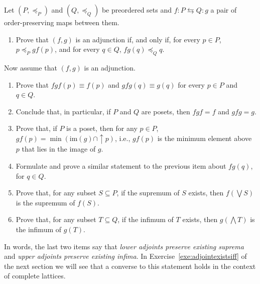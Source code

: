 \begin{exercise}\label{exe:adjunctions}
  Let $(P,\preceq_P)$ and $(Q,\preceq_Q)$ be preordered sets and $f \colon P \leftrightarrows Q \colon g$ a pair of order-preserving maps between them.
  \begin{enumerate}
  \item Prove that $(f,g)$ is an adjunction if, and only if, for every $p \in P$, $p \preceq_P gf(p)$, and for every $q \in Q$, $fg(q) \preceq_Q q$.
  \end{enumerate}
  Now assume that $(f,g)$ is an adjunction.
  \begin{enumerate}[resume]
  \item Prove that $fgf(p) \equiv f(p)$ and $gfg(q) \equiv g(q)$ for every $p \in P$ and $q \in Q$.
  \item Conclude that, in particular, if $P$ and $Q$ are posets, then $fgf = f$ and $gfg = g$.
  \item \label{itm:minimumimage} Prove that, if $P$ is a poset, then for any $p \in P$, $gf(p) = \min (\mathrm{im}(g) \cap {\uparrow} p)$, i.e., $gf(p)$ is the minimum element above $p$ that lies in the image of $g$.
  \item Formulate and prove a similar statement to the previous item about $fg(q)$, for $q \in Q$.
  \item \label{itm:leftadjointpreservessup} Prove that, for any subset $S \subseteq P$, if the supremum of $S$ exists, then $f\left(\bigvee S\right)$ is the supremum of $f(S)$.
  \item Prove that, for any subset $T \subseteq Q$, if the infimum of $T$ exists, then $g\left(\bigwedge T\right)$ is the infimum of $g(T)$.
  \end{enumerate}
  In words, the last two items say that \emph{lower adjoints preserve existing suprema} and \emph{upper adjoints preserve existing infima}. In Exercise~\ref{exe:adjointexistsiff} of the next section we will see that a converse to this statement holds in the context of complete lattices.
  \end{exercise}

